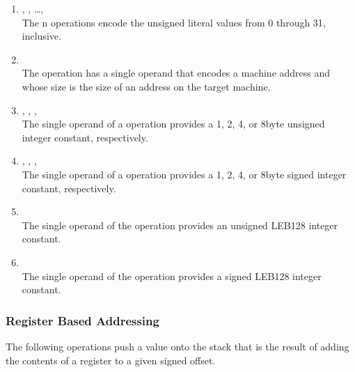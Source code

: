 \begin{enumerate}[1]
\item {}, , \dots,  \\
The n operations encode the unsigned literal values
from 0 through 31, inclusive.

\item {} \\
The  operation has a single operand that encodes
a machine address and whose size is the size of an address
on the target machine.

\item {}, , ,  \\
The single operand of a  operation provides a 1,
2, 4, or 8\dash byte unsigned integer constant, respectively.

\item {} , , ,  \\
The single operand of a  operation provides a 1,
2, 4, or 8\dash byte signed integer constant, respectively.

\item {} \\
The single operand of the  operation provides
an unsigned LEB128 integer constant.

\item {} \\
The single operand of the  operation provides
a signed LEB128 integer constant.

\end{enumerate}


\subsubsection{Register Based Addressing}
\label{chap:registerbasedaddressing}
The following operations push a value onto the stack that is
the result of adding the contents of a register to a given
signed offset.

